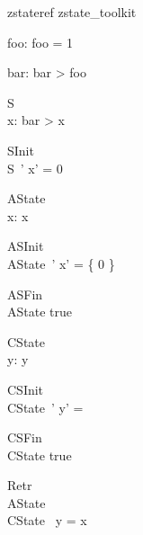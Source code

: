 
\begin{zsection}
   \SECTION zstateref \parents zstate\_toolkit
\end{zsection}

\begin{axdef}
   foo: \nat
\where
   foo = 1
\end{axdef}

\begin{axdef}
   bar: \nat
\where
   bar > foo
\end{axdef}


\begin{schema}{S}
  \zstate \\
  x: \nat
\where
   bar > x
\end{schema}

\begin{schema}{SInit}
  \zstinit \\
   S~'
\where
   x' = 0
\end{schema}

\begin{schema}{AState}
  \zastate \\
   x: \power \nat
\where
  x \neq \emptyset
\end{schema}

\begin{schema}{ASInit}
  \zastinit \\
   AState~'
\where
   x' = \{ 0 \}
\end{schema}

\begin{schema}{ASFin}
  \zastfin \\
   AState
\where
   true
\end{schema}

\begin{schema}{CState}
  \zcstate \\
  y: \seq \nat
\where
   y \neq \langle \rangle
\end{schema}

\begin{schema}{CSInit}
  \zcstinit \\
   CState~'
\where
  y' =  \rangle
\end{schema}

\begin{schema}{CSFin}
  \zcstfin \\
   CState
\where
   true
\end{schema}

\begin{schema}{Retr}
  \zretrieve \\
   AState \\
   CState
\where
   \ran~y = x
\end{schema}

